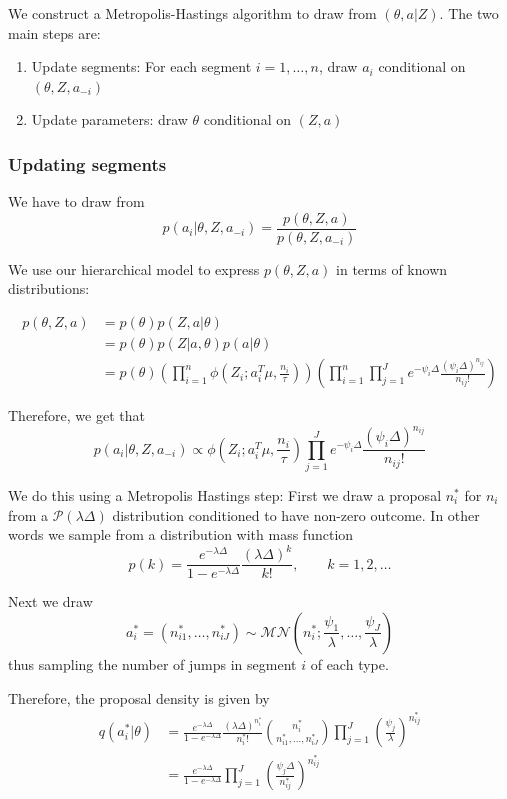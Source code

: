 \documentclass[a4paper,11pt]{article}
\theoremstyle{theorem}
\theoremstyle{definition}
\begin{document}
We construct a Metropolis-Hastings algorithm to draw from $(\theta, a | Z)$. The two main steps are:
\begin{enumerate}
\item Update segments: For each segment $i = 1, \dotsc, n$, draw $a_i$ conditional on $(\theta, Z, a_{-i})$
\item Update parameters: draw $\theta$ conditional on $(Z, a)$
\end{enumerate}
 
\subsubsection{Updating segments}

We have to draw from
\begin{equation}
p(a_i | \theta, Z, a_{-i}) = \frac{p(\theta, Z, a)}{p(\theta, Z, a_{-i})}
\end{equation}

We use our hierarchical model to express $p(\theta, Z, a)$ in terms of known distributions:

\begin{align*}
p(\theta, Z, a) &= p(\theta)p(Z, a | \theta) \\
&= p(\theta)p(Z | a, \theta)p(a | \theta) \\
&= p(\theta)\left(\prod_{i=1}^{n}{\phi\left(Z_i; a_{i}^T \mu, \frac{n_i}{\tau}\right)}\right)\left(\prod_{i=1}^{n}{\prod_{j=1}^{J}{e^{-\psi_i \Delta}\frac{(\psi_i \Delta)^{n_{ij}}}{n_{ij}!}}}\right)
\end{align*}

Therefore, we get that
\[
p(a_i | \theta, Z, a_{-i}) \propto \phi\left(Z_i; a_{i}^T \mu, \frac{n_i}{\tau}\right)\prod_{j=1}^{J}{e^{-\psi_i \Delta}\frac{(\psi_i \Delta)^{n_{ij}}}{n_{ij}!}}
\]

We do this using a Metropolis Hastings step:
First we draw a proposal $n_{i}^{\ast}$ for $n_i$ from a $\mathcal{P}(\lambda \Delta)$ distribution conditioned to have non-zero outcome. In other words we sample from a distribution with mass function
\[
p(k) = \frac{e^{-\lambda \Delta}}{1 - e^{-\lambda \Delta}} \frac{(\lambda \Delta)^k}{k!}, \qquad k = 1, 2, \dotsc
\]

Next we draw
\[
a_{i}^{\ast} = (n_{i1}^{\ast}, \dotsc, n_{iJ}^{\ast}) \sim \mathcal{MN}\left(n_{i}^{\ast}; \frac{\psi_1}{\lambda}, \dotsc, \frac{\psi_J}{\lambda}\right)
\]
thus sampling the number of jumps in segment $i$ of each type.

Therefore, the proposal density is given by
\begin{align*}
q(a_{i}^{\ast} | \theta) &= \frac{e^{-\lambda \Delta}}{1 - e^{-\lambda \Delta}} \frac{(\lambda \Delta)^{n_{i}^{\ast}}}{n_{i}^{\ast}!} \binom{n_{i}^{\ast}}{n_{i1}^{\ast}, \dotsc, n_{iJ}^{\ast}} \prod_{j=1}^{J}{\left(\frac{\psi_j}{\lambda}\right)^{n_{ij}^{\ast}}} \\
&= \frac{e^{-\lambda \Delta}}{1 - e^{-\lambda \Delta}} \prod_{j=1}^{J}{\left(\frac{\psi_j \Delta}{n_{ij}^{\ast}}\right)^{n_{ij}^{\ast}}}
\end{align*}
\end{document}
